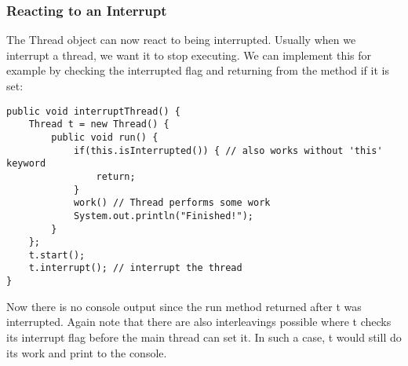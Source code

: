 \documentclass[main.tex]{subfiles}
\begin{document}
\subsubsection{Reacting to an Interrupt}
The Thread object can now react to being interrupted. Usually when we interrupt a thread, we want it to stop executing. We can implement this for example by checking the interrupted flag and returning from the method if it is set:
\begin{verbatim}
public void interruptThread() {
    Thread t = new Thread() {
        public void run() {
            if(this.isInterrupted()) { // also works without 'this' keyword
                return;
            }
            work() // Thread performs some work
            System.out.println("Finished!");
        }
    };
    t.start();
    t.interrupt(); // interrupt the thread
}
\end{verbatim}
Now there is no console output since the run method returned after t was interrupted. Again note that there are also interleavings possible where t checks its interrupt flag before the main thread can set it. In such a case, t would still do its work and print to the console.
\end{document}
